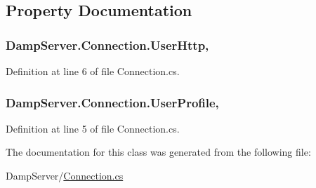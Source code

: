 \subsection{Property Documentation}
\hypertarget{class_damp_server_1_1_connection_abd84746d981fefcfcfcda4d4e6fdc218}{
\subsubsection[{User\-Http}]{ Damp\-Server.\-Connection.\-User\-Http\hspace{0.3cm}{\ttfamily [get]}, {\ttfamily [set]}}}\label{class_damp_server_1_1_connection_abd84746d981fefcfcfcda4d4e6fdc218}


Definition at line 6 of file Connection.\-cs.

\hypertarget{class_damp_server_1_1_connection_a19a30edf0b8deb8ec02d257f03ce8633}{
\subsubsection[{User\-Profile}]{ Damp\-Server.\-Connection.\-User\-Profile\hspace{0.3cm}{\ttfamily [get]}, {\ttfamily [set]}}}\label{class_damp_server_1_1_connection_a19a30edf0b8deb8ec02d257f03ce8633}


Definition at line 5 of file Connection.\-cs.



The documentation for this class was generated from the following file\-:\begin{DoxyCompactItemize}
\item 
Damp\-Server/\hyperlink{_connection_8cs}{Connection.\-cs}\end{DoxyCompactItemize}
